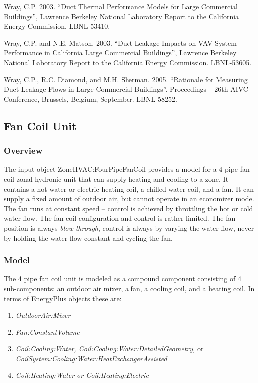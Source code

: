 Wray, C.P. 2003. ``Duct Thermal Performance Models for Large Commercial Buildings'', Lawrence Berkeley National Laboratory Report to the California Energy Commission. LBNL-53410.

Wray, C.P. and N.E. Matson. 2003. ``Duct Leakage Impacts on VAV System Performance in California Large Commercial Buildings'', Lawrence Berkeley National Laboratory Report to the California Energy Commission. LBNL-53605.

Wray, C.P., R.C. Diamond, and M.H. Sherman. 2005. ``Rationale for Measuring Duct Leakage Flows in Large Commercial Buildings''. Proceedings -- 26th AIVC Conference, Brussels, Belgium, September. LBNL-58252.

\subsection{Fan Coil Unit}\label{fan-coil-unit}

\subsubsection{Overview}\label{overview-4-003}

The input object ZoneHVAC:FourPipeFanCoil provides a model for a 4 pipe fan coil zonal hydronic unit that can supply heating and cooling to a zone. It contains a hot water or electric heating coil, a chilled water coil, and a fan. It can supply a fixed amount of outdoor air, but cannot operate in an economizer mode. The fan runs at constant speed -- control is achieved by throttling the hot or cold water flow. The fan coil configuration and control is rather limited. The fan position is always \emph{blow-through}, control is always by varying the water flow, never by holding the water flow constant and cycling the fan.

\subsubsection{Model}\label{model-3-000}

The 4 pipe fan coil unit is modeled as a compound component consisting of 4 sub-components: an outdoor air mixer, a fan, a cooling coil, and a heating coil. In terms of EnergyPlus objects these are:

\begin{enumerate}
  \item \emph{OutdoorAir:Mixer}
  \item \emph{Fan:ConstantVolume}
  \item \emph{Coil:Cooling:Water, Coil:Cooling:Water:DetailedGeometry,} or \\ \emph{CoilSystem:Cooling:Water:HeatExchangerAssisted}
  \item \emph{Coil:Heating:Water or Coil:Heating:Electric}
\end{enumerate}


